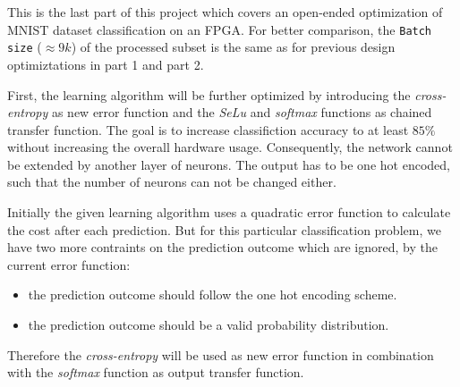 \documentclass[../main.tex]{subfiles}
\begin{document}
This is the last part of this project which covers an open-ended optimization of MNIST dataset classification on an FPGA. 
For better comparison, the \texttt{Batch size} ($\approx 9k$) of the processed subset is the same as for previous design optimiztations in part 1 and part 2.

First, the learning algorithm will be further optimized by introducing the \textit{cross-entropy} as new error function and the \textit{SeLu} and \textit{softmax} functions as chained transfer function. The goal is to increase classifiction accuracy to at least $85\si{\percent}$ without increasing the overall hardware usage.
Consequently, the network cannot be extended by another layer of neurons. The output has to be one hot encoded, such that the number of neurons can not be changed either.

Initially the given learning algorithm uses a quadratic error function to calculate the cost after each prediction. But for this particular classification problem, we have two more contraints on the prediction outcome which are ignored, by the current error function:
\begin{itemize}
	\item the prediction outcome should follow the one hot encoding scheme.
	\item the prediction outcome should be a valid probability distribution.
\end{itemize}
Therefore the \textit{cross-entropy} will be used as new error function in combination with the \textit{softmax} function as output transfer function.
\end{document}

